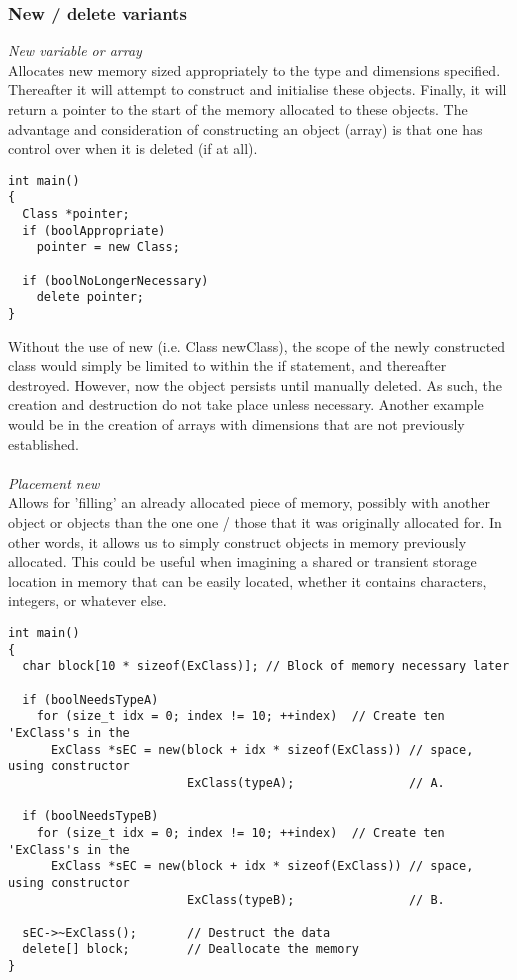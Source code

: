 \subsubsection*{New / delete variants}

\textit{New variable or array} \\
Allocates new memory sized appropriately to the type and dimensions specified. Thereafter it will attempt to construct and initialise these objects. Finally, it will return a pointer to the start of the memory allocated to these objects. The advantage and consideration of constructing an object (array) is that one has control over when it is deleted (if at all).

\begin{lstlisting}[style=inline]
int main()
{
  Class *pointer;
  if (boolAppropriate)
    pointer = new Class;

  if (boolNoLongerNecessary)
    delete pointer;
}
\end{lstlisting}

Without the use of new (i.e. Class newClass), the scope of the newly constructed class would simply be limited to within the if statement, and thereafter destroyed. However, now the object persists until manually deleted. As such, the creation and destruction do not take place unless necessary. Another example would be in the creation of arrays with dimensions that are not previously established. \\
\\
\textit{Placement new} \\
Allows for 'filling' an already allocated piece of memory, possibly with another object or objects than the one one / those that it was originally allocated for. In other words, it allows us to simply construct objects in memory previously allocated. This could be useful when imagining a shared or transient storage location in memory that can be easily located, whether it contains characters, integers, or whatever else.

\begin{lstlisting}[style=inline]
int main()
{
  char block[10 * sizeof(ExClass)]; // Block of memory necessary later

  if (boolNeedsTypeA)
    for (size_t idx = 0; index != 10; ++index)  // Create ten 'ExClass's in the
      ExClass *sEC = new(block + idx * sizeof(ExClass)) // space, using constructor
                         ExClass(typeA);                // A.

  if (boolNeedsTypeB)
    for (size_t idx = 0; index != 10; ++index)  // Create ten 'ExClass's in the
      ExClass *sEC = new(block + idx * sizeof(ExClass)) // space, using constructor
                         ExClass(typeB);                // B.

  sEC->~ExClass();       // Destruct the data
  delete[] block;        // Deallocate the memory
}
\end{lstlisting}

